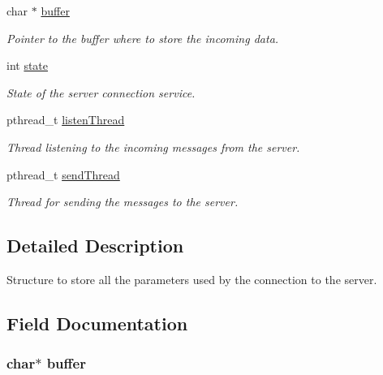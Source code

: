 \begin{DoxyCompactItemize}
char $\ast$ \hyperlink{struct_s_s_c___s_t_a_t_aff2566f4c366b48d73479bef43ee4d2e}{buffer}
\begin{DoxyCompactList}\small\item\em Pointer to the buffer where to store the incoming data. \end{DoxyCompactList}\item 
int \hyperlink{struct_s_s_c___s_t_a_t_a89f234133d3efe315836311cbf21c64b}{state}
\begin{DoxyCompactList}\small\item\em State of the server connection service. \end{DoxyCompactList}\item 
pthread\+\_\+t \hyperlink{struct_s_s_c___s_t_a_t_a25ed3dd1e477db634fc901c587d710a7}{listen\+Thread}
\begin{DoxyCompactList}\small\item\em Thread listening to the incoming messages from the server. \end{DoxyCompactList}\item 
pthread\+\_\+t \hyperlink{struct_s_s_c___s_t_a_t_aa99c14bb21c7dc3e0f126ee818a54a2b}{send\+Thread}
\begin{DoxyCompactList}\small\item\em Thread for sending the messages to the server. \end{DoxyCompactList}\end{DoxyCompactItemize}


\subsection{Detailed Description}
Structure to store all the parameters used by the connection to the server. 

\subsection{Field Documentation}
\subsubsection[{\texorpdfstring{buffer}{buffer}}]{\setlength{\rightskip}{0pt plus 5cm}char$\ast$ buffer}\hypertarget{struct_s_s_c___s_t_a_t_aff2566f4c366b48d73479bef43ee4d2e}{}\label{struct_s_s_c___s_t_a_t_aff2566f4c366b48d73479bef43ee4d2e}


